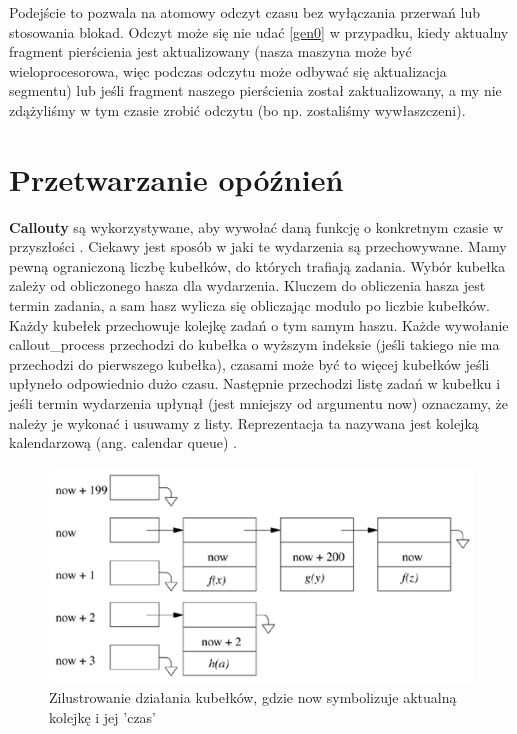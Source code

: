 \documentclass[shortabstract]{iithesis}
\theoremstyle{definition} \newtheorem*{definition}{Definicja}
\theoremstyle{definition} \newtheorem*{example}{Przykład}
\theoremstyle{definition} \newtheorem*{remark}{Uwaga}
\begin{document}
Podejście to pozwala na atomowy odczyt czasu bez wyłączania przerwań lub stosowania blokad. Odczyt może się nie udać \ref{gen0} w przypadku, kiedy aktualny fragment pierścienia jest aktualizowany (nasza maszyna może być wieloprocesorowa, więc podczas odczytu może odbywać się aktualizacja segmentu) lub jeśli fragment naszego pierścienia został zaktualizowany, a my nie zdążyliśmy w tym czasie zrobić odczytu (bo np. zostaliśmy wywłaszczeni). 

\section{Przetwarzanie opóźnień}

\textbf{Callouty} są wykorzystywane, aby wywołać daną funkcję o konkretnym czasie w przyszłości \cite{bib:calloutbsd}. Ciekawy jest sposób w jaki te wydarzenia są przechowywane. Mamy pewną ograniczoną liczbę kubełków, do których trafiają zadania. Wybór kubełka zależy od obliczonego hasza dla wydarzenia. Kluczem do obliczenia hasza jest termin zadania, a sam hasz wylicza się obliczając modulo po liczbie kubełków. Każdy kubełek przechowuje kolejkę zadań o tym samym haszu. Każde wywołanie callout\_process przechodzi do kubełka o wyższym indeksie (jeśli takiego nie ma przechodzi do pierwszego kubełka), czasami może być to więcej kubełków jeśli upłyneło odpowiednio dużo czasu. Następnie przechodzi listę zadań w kubełku i jeśli termin wydarzenia upłynął (jest mniejszy od argumentu now) oznaczamy, że należy je wykonać i usuwamy z listy. Reprezentacja ta nazywana jest kolejką kalendarzową (ang. calendar queue) \cite{bib:callendarqueue}.

\begin{figure}[ht]
\centering
\includegraphics[scale=0.7]{images/callout.png}
\caption{Zilustrowanie działania kubełków, gdzie now symbolizuje aktualną kolejkę i jej 'czas' \cite{bib:freebsd-os}}
\end{figure} 
\end{document}
